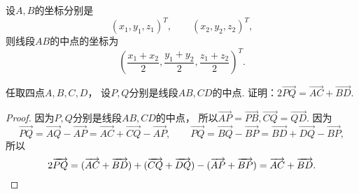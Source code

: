 \begin{corollary}
设\(A,B\)的坐标分别是\begin{equation*}
	(x_1,y_1,z_1)^T, \qquad
	(x_2,y_2,z_2)^T,
\end{equation*}
则线段\(AB\)的中点的坐标为
\begin{equation}
	\left(
		\frac{x_1 + x_2}{2},
		\frac{y_1 + y_2}{2},
		\frac{z_1 + z_2}{2}
	\right)^T.
\end{equation}
\end{corollary}

\begin{example}
任取四点\(A,B,C,D\)，
设\(P,Q\)分别是线段\(AB,CD\)的中点.
证明：\(2 \vec{PQ} = \vec{AC} + \vec{BD}\).
\begin{proof}
因为\(P,Q\)分别是线段\(AB,CD\)的中点，
所以\(
	\vec{AP} = \vec{PB},
	\vec{CQ} = \vec{QD}
\).
因为\begin{equation*}
	\vec{PQ}
	= \vec{AQ} - \vec{AP}
	= \vec{AC} + \vec{CQ} - \vec{AP},
	\qquad
	\vec{PQ}
	= \vec{BQ} - \vec{BP}
	= \vec{BD} + \vec{DQ} - \vec{BP},
\end{equation*}
所以\begin{equation*}
	2 \vec{PQ}
	= (\vec{AC} + \vec{BD})
	+ (\vec{CQ} + \vec{DQ})
	- (\vec{AP} + \vec{BP})
	= \vec{AC} + \vec{BD}.
	\qedhere
\end{equation*}
\end{proof}
\end{example}

